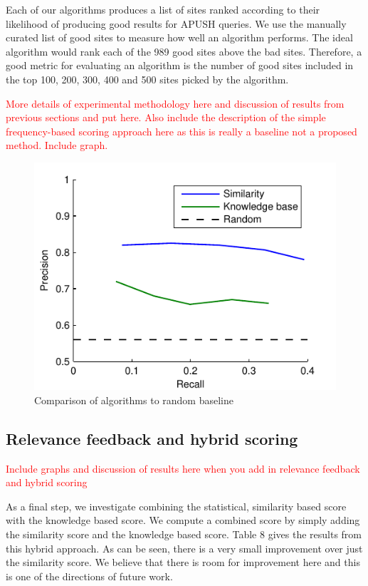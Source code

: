 \documentclass{acm_proc_article-sp}
\begin{document}
Each of our algorithms produces a list of sites ranked according to their
likelihood of producing good results for APUSH queries. We use the manually
curated list of good sites to measure how well an algorithm performs. The ideal
algorithm would rank each of the 989 good sites above the bad sites. Therefore,
a good metric for evaluating an algorithm is the number of good sites included
in the top 100, 200, 300, 400 and 500 sites picked by the algorithm. 

\textcolor{red}{More details of experimental methodology here and discussion
  of results from previous sections and put here. Also include the description
  of the simple frequency-based scoring approach here as this is really a baseline
  not a proposed method. Include graph.}  

\begin{figure}
\includegraphics{expt}
\caption{Comparison of algorithms to random baseline}
\label{fig-expt}
\end{figure}

\subsection{Relevance feedback and hybrid scoring}

\textcolor{red}{Include graphs and discussion of results here when you add in
  relevance feedback and hybrid scoring}

As a final step, we investigate combining the statistical, similarity based
score with the knowledge based score. We compute a combined score by simply
adding the similarity score and the knowledge based score. Table 8 gives the
results from this hybrid approach. As can be seen, there is a very small
improvement over just the similarity score. We believe that there is room for
improvement here and this is one of the directions of future work. 
\end{document}

